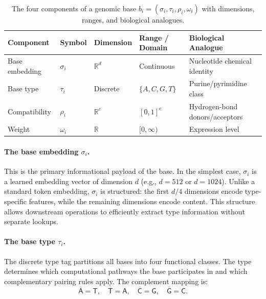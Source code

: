 \begin{table}[H]
\centering
\caption{The four components of a genomic base $b_i = (\sigma_i, \tau_i, \rho_i, \omega_i)$ with dimensions, ranges, and biological analogues.}
\label{tab:genomic-base-components}
\renewcommand{\arraystretch}{1.25}
\begin{tabularx}{\textwidth}{L{2.2cm} C{2cm} C{2.2cm} Y Y}
\toprule
\textbf{Component} & \textbf{Symbol} & \textbf{Dimension} & \textbf{Range / Domain} & \textbf{Biological Analogue} \\
\midrule
Base embedding & $\sigma_i$ & $\mathbb{R}^d$ & Continuous & Nucleotide chemical identity \\
Base type & $\tau_i$ & Discrete & $\{A, C, G, T\}$ & Purine/pyrimidine class \\
Compatibility & $\rho_i$ & $\mathbb{R}^c$ & $[0,1]^c$ & Hydrogen-bond donors/acceptors \\
Weight & $\omega_i$ & $\mathbb{R}$ & $[0, \infty)$ & Expression level \\
\bottomrule
\end{tabularx}
\end{table}

\paragraph{The base embedding $\sigma_i$.} This is the primary informational payload of the base. In the simplest case, $\sigma_i$ is a learned embedding vector of dimension $d$ (e.g., $d = 512$ or $d = 1024$). Unlike a standard token embedding, $\sigma_i$ is structured: the first $d/4$ dimensions encode type-specific features, while the remaining dimensions encode content. This structure allows downstream operations to efficiently extract type information without separate lookups.

\paragraph{The base type $\tau_i$.} The discrete type tag partitions all bases into four functional classes. The type determines which computational pathways the base participates in and which complementary pairing rules apply. The complement mapping is:
\begin{equation}
\overline{\mathsf{A}} = \mathsf{T}, \quad \overline{\mathsf{T}} = \mathsf{A}, \quad \overline{\mathsf{C}} = \mathsf{G}, \quad \overline{\mathsf{G}} = \mathsf{C}.
\label{eq:complement}
\end{equation}

